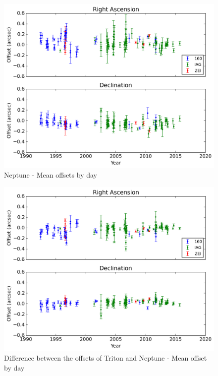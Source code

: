 \documentclass[12pt,a4paper]{report}
\begin{document}
\begin{figure}
\includegraphics[width=16.0cm]{Netuno_media.png} 
\caption{Neptune - Mean offsets by day}
\label{Fig:netuno-media}
\end{figure}
\begin{figure}
\includegraphics[width=16.0cm]{Triton-Netuno_media.png} 
\caption{Difference between the offsets of Triton and Neptune - Mean offset by day}
\label{Fig:triton-netuno-mean}
\end{figure}




\end{document}
